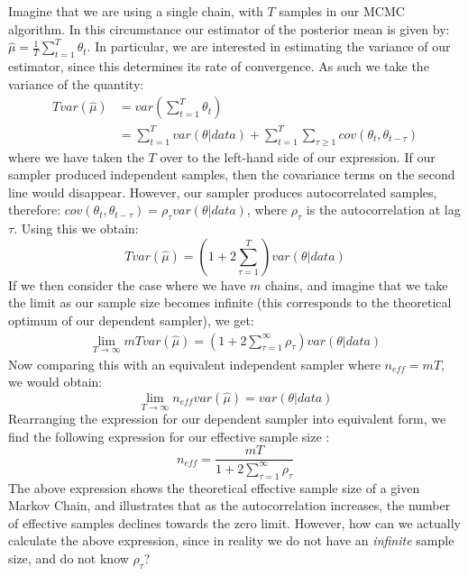 \documentclass[11pt,fullpage]{book}
\begin{document}
Imagine that we are using a single chain, with $T$ samples in our MCMC algorithm. In this circumstance our estimator of the posterior mean is given by: $\hat{\mu}=\frac{1}{T}\sum\limits_{t=1}^{T} \theta_t$. In particular, we are interested in estimating the variance of our estimator, since this determines its rate of convergence. As such we take the variance of the quantity:
%
\begin{align}
T var(\hat{\mu}) &= var(\sum\limits_{t=1}^{T} \theta_t)\\
&= \sum\limits_{t=1}^{T} var(\theta|data) + \sum\limits_{t=1}^{T} \sum\limits_{\tau\geq 1} cov(\theta_t,\theta_{t-\tau})
\end{align}
%
where we have taken the $T$ over to the left-hand side of our expression. If our sampler produced independent samples, then the covariance terms on the second line would disappear. However, our sampler produces autocorrelated samples, therefore: $cov(\theta_t,\theta_{t-\tau}) = \rho_\tau var(\theta|data)$, where $\rho_\tau$ is the autocorrelation at lag $\tau$. Using this we obtain:
%
\begin{equation}
T var(\hat{\mu}) = \left(1+ 2 \sum\limits_{\tau=1}^{T}\right) var(\theta|data)
\end{equation}
%
If we then consider the case where we have $m$ chains, and imagine that we take the limit as our sample size becomes infinite (this corresponds to the theoretical optimum of our dependent sampler), we get:
%
\begin{align}
\lim\limits_{T\rightarrow\infty} m T var(\hat{\mu}) = \left(1 + 2 \sum\limits_{\tau=1}^{\infty}\rho_\tau\right)var(\theta|data)
\end{align}
%
Now comparing this with an equivalent independent sampler where $n_{eff} = m T$, we would obtain:
%
\begin{equation}
\lim\limits_{T\rightarrow\infty} n_{eff} var(\hat{\mu}) = var(\theta|data)
\end{equation}
%
Rearranging the expression for our dependent sampler into equivalent form, we find the following expression for our effective sample size \cite{gelman2013bayesian}:
%
\begin{equation}
n_{eff} = \frac{m T}{1 + 2 \sum\limits_{\tau=1}^{\infty}\rho_\tau}
\end{equation}
%
The above expression shows the theoretical effective sample size of a given Markov Chain, and illustrates that as the autocorrelation increases, the number of effective samples declines towards the zero limit. However, how can we actually calculate the above expression, since in reality we do not have an \textit{infinite} sample size, and do not know $\rho_\tau$?
\end{document}
